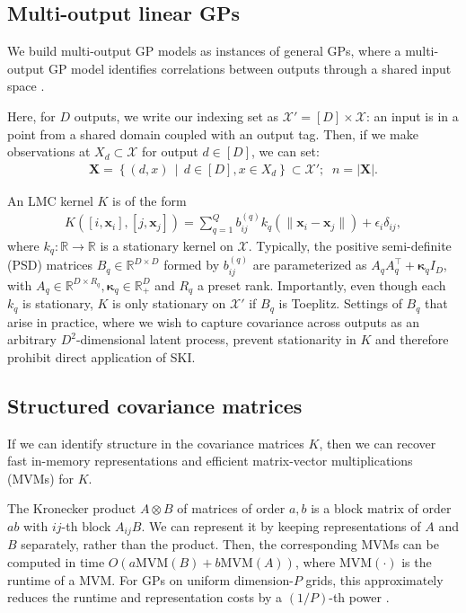 \documentclass{article}
\def\bsk{{\boldsymbol\kappa}}
\def \R {\mathbb{R}}
\def\Tx{\textbf{x}}
\def\TX{\textbf{X}}
\newcommand{\set}[2]{ \left\{ #1 \,\middle|\, #2 \right\} }
\newcommand{\card}[1]{\left\vert{#1}\right\vert}
\newcommand{\norm}[1]{\mathopen\| #1 \mathclose\|}%
\def \mcX {\mathcal{X}}
\begin{document}
\subsection{Multi-output linear GPs}

We build multi-output GP models as instances of general GPs, where a multi-output GP model identifies correlations between outputs through a shared input space \cite{alvarez2012kernels}.

Here, for $D$ outputs, we write our indexing set as $\mcX'=[D]\times \mcX$: an input is in a point from a shared domain coupled with an output tag. Then, if we make observations at $X_d\subset\mcX$ for output $d\in[D]$, we can set:
\begin{align*}
\TX=\set{(d, x)}{d\in[D],x\in X_d}\subset{\mcX'};\;\; n=\card{\TX}.
\end{align*}

An LMC kernel $K$ is of the form 
\begin{align}
K([i,\Tx_i],[j,\Tx_j])=\sum_{q=1}^Qb_{ij}^{(q)}k_q(\norm{\Tx_i-\Tx_j})+\epsilon_i\delta_{ij},\label{lmcpointwise}
\end{align} 
where $k_q:\R\rightarrow\R$ is a stationary kernel on $\mcX$. Typically, the positive semi-definite (PSD) matrices $B_q\in\R^{D\times D}$ formed by $b_{ij}^{(q)}$ are parameterized as $A_qA_q^\top+\bsk_q I_D$, with $A_q\in\R^{D\times R_q},\bsk_q\in\R_+^D$ and $R_q$ a preset rank. Importantly, even though each $k_q$ is stationary, $K$ is only stationary on $\mcX'$ if $B_q$ is Toeplitz. Settings of $B_q$ that arise in practice, where we wish to capture covariance across outputs as an arbitrary $D^2$-dimensional latent process,  prevent stationarity in $K$ and therefore prohibit direct application of SKI.

\subsection{Structured covariance matrices}

If we can identify structure in the covariance matrices $K$, then we can recover fast in-memory representations and efficient matrix-vector multiplications (MVMs) for $K$.

The Kronecker product $A\otimes B$ of matrices of order $a,b$ is a block matrix of order $ab$ with $ij$-th block $A_{ij}B$. We can represent it by keeping representations of $A$ and $B$ separately, rather than the product. Then, the corresponding MVMs can be computed in time $O(a\text{MVM}(B)+b\text{MVM}(A))$, where $\text{MVM}(\cdot)$ is the runtime of a MVM. For GPs on uniform dimension-$P$ grids, this approximately reduces the runtime and representation costs by a $(1/P)$-th power \cite{gilboa2015scaling}.
\end{document}
